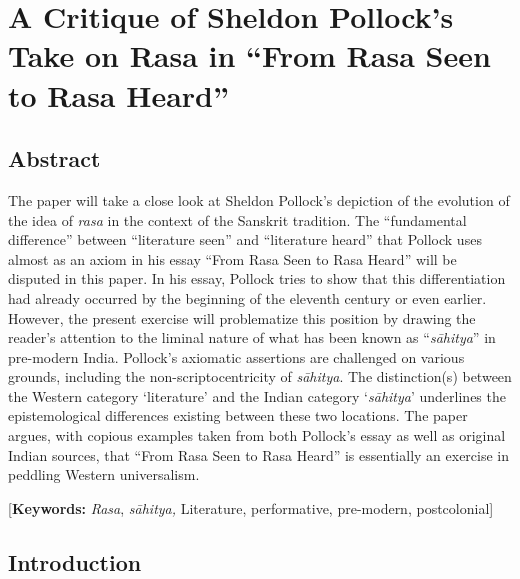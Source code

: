 \chapter[A Critique of Sheldon Pollock’s Take on Rasa...]{A Critique of Sheldon Pollock’s Take on Rasa in “From Rasa Seen to Rasa Heard”}\label{chapter\thechapter:begin}




\section*{Abstract}

The paper will take a close look at Sheldon Pollock’s depiction of the evolution of the idea of \textsl{rasa} in the context of the Sanskrit tradition. The “fundamental difference” between “literature seen” and “literature heard” that Pollock uses almost as an axiom in his essay “From Rasa Seen to Rasa Heard” will be disputed in this paper. In his essay, Pollock tries to show that this differentiation had already occurred by the beginning of the eleventh century or even earlier. However, the present exercise will problematize this position by drawing the reader’s attention to the liminal nature of what has been known as “\textsl{sāhitya}” in pre-modern India. Pollock’s axiomatic assertions are challenged on various grounds, including the non-scriptocentricity of \textsl{sāhitya}. The distinction(s) between the Western category ‘literature’ and the Indian category ‘\textsl{sāhitya}’ underlines the epistemological differences existing between these two locations. The paper argues, with copious examples taken from both Pollock’s essay as well as original Indian sources, that “From Rasa Seen to Rasa Heard” is essentially an exercise in peddling Western universalism.       

[{\bf Keywords:} \textsl{Rasa}, \textsl{sāhitya,} Literature, performative, pre-modern, postcolonial]

\section*{Introduction}


